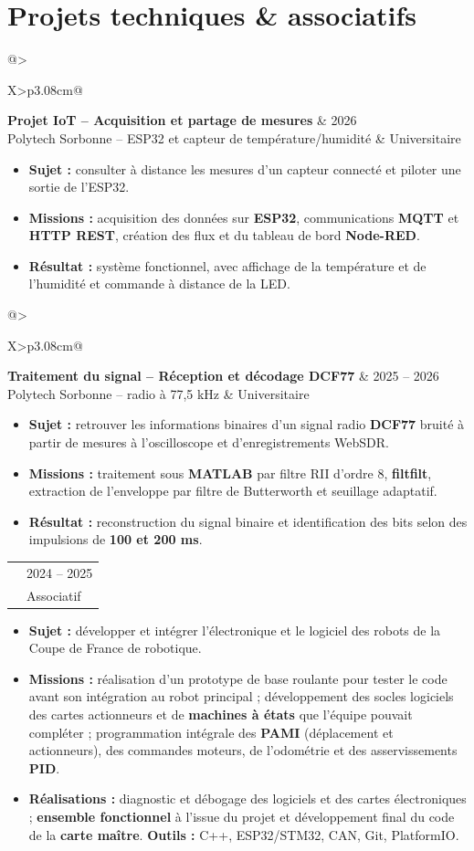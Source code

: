 \documentclass[10pt,a4paper]{extarticle}
\makeatletter
\newcommand{\entry}[4]{%
\begin{tabularx}{\linewidth}{@{}>{\raggedright\arraybackslash}X>{\raggedleft\arraybackslash}p{3.08cm}@{}}
 {\bfseries\color{bleu}#1} & {\fontsize{9}{10.3}\selectfont\color{secondaire}#2} \\[-2pt]
 {\fontsize{9}{10.4}\selectfont\color{secondaire}#3} & {\fontsize{9}{10.3}\selectfont\color{secondaire}#4}
\end{tabularx}\vspace{-2.6pt}\par}
\newcommand{\gapentry}{\vspace{2.4pt}}
\makeatother
\begin{document}
\section{Projets techniques \& associatifs}
\entry{Projet IoT -- Acquisition et partage de mesures}{2026}{Polytech Sorbonne -- ESP32 et capteur de température/humidité}{Universitaire}
\begin{itemize}
  \item \textbf{Sujet :} consulter à distance les mesures d'un capteur connecté et piloter une sortie de l'ESP32.
  \item \textbf{Missions :} acquisition des données sur \textbf{ESP32}, communications \textbf{MQTT} et \textbf{HTTP REST}, création des flux et du tableau de bord \textbf{Node-RED}.
  \item \textbf{Résultat :} système fonctionnel, avec affichage de la température et de l'humidité et commande à distance de la LED.
\end{itemize}
\gapentry
\entry{Traitement du signal -- Réception et décodage DCF77}{2025 -- 2026}{Polytech Sorbonne -- radio à 77,5 kHz}{Universitaire}
\begin{itemize}
  \item \textbf{Sujet :} retrouver les informations binaires d'un signal radio \textbf{DCF77} bruité à partir de mesures à l'oscilloscope et d'enregistrements WebSDR.
  \item \textbf{Missions :} traitement sous \textbf{MATLAB} par filtre RII d'ordre 8, \textbf{filtfilt}, extraction de l'enveloppe par filtre de Butterworth et seuillage adaptatif.
  \item \textbf{Résultat :} reconstruction du signal binaire et identification des bits selon des impulsions de \textbf{100 et 200 ms}.
\end{itemize}
\gapentry
\entry{Coupe de France de robotique -- Responsable électronique / asservissement}{2024 -- 2025}{Club CRAC -- robot autonome développé en équipe}{Associatif}
\begin{itemize}
  \item \textbf{Sujet :} développer et intégrer l'électronique et le logiciel des robots de la Coupe de France de robotique.
  \item \textbf{Missions :} réalisation d'un prototype de base roulante pour tester le code avant son intégration au robot principal ; développement des socles logiciels des cartes actionneurs et de \textbf{machines à états} que l'équipe pouvait compléter ; programmation intégrale des \textbf{PAMI} (déplacement et actionneurs), des commandes moteurs, de l'odométrie et des asservissements \textbf{PID}.
  \item \textbf{Réalisations :} diagnostic et débogage des logiciels et des cartes électroniques ; \textbf{ensemble fonctionnel} à l'issue du projet et développement final du code de la \textbf{carte maître}. \textbf{Outils :} C++, ESP32/STM32, CAN, Git, PlatformIO.
\end{itemize}
\end{document}
